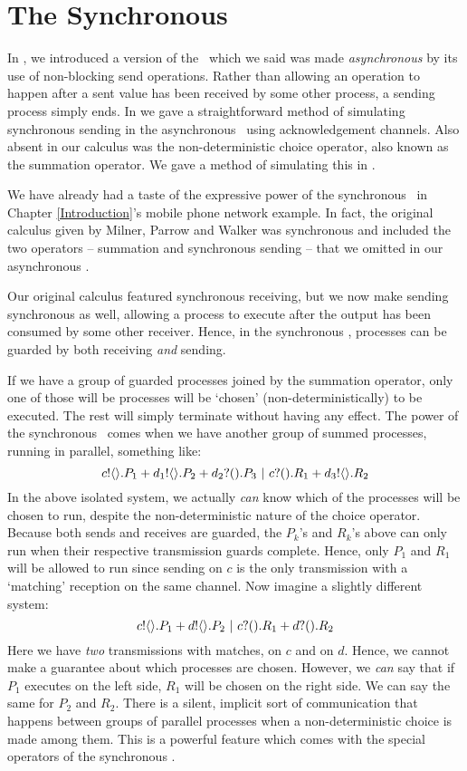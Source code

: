 \chapter{The Synchronous \Picalc}\label{sync_and_express}
In , we introduced a version of the \picalc\ which we said was made \emph{asynchronous} by its use of non-blocking send operations.  
Rather than allowing an operation to happen after a sent value has been received by some other process, a sending process simply ends.  
In  we gave a straightforward method of simulating synchronous sending in the asynchronous \picalc\ using acknowledgement channels.  
Also absent in our calculus was the non-deterministic choice operator, also known as the summation operator.  
We gave a method of simulating this in .

We have already had a taste of the expressive power of the synchronous \picalc\ in Chapter \ref{Introduction}'s mobile phone network example.  In fact, the original calculus given by Milner, Parrow and Walker was synchronous and included the two operators -- summation and synchronous sending -- that we omitted in our asynchronous \picalc.  

Our original calculus featured synchronous receiving, but we now make sending synchronous as well, allowing a process to execute after the output has been consumed by some other receiver.  
Hence, in the synchronous \picalc, processes can be guarded by both receiving \emph{and} sending.  


If we have a group of guarded processes joined by the summation operator, only one of those will be processes will be `chosen' (non-deterministically) to be executed.  
The rest will simply terminate without having any effect.  
The power of the synchronous \picalc\ comes when we have another group of summed processes, running in parallel, something like: 
\[
	{c}!\langle{}\rangle.P_1 + {d_1}!\langle{}\rangle.P_2 + {d_2}?({}).P_3 \ |\  {c}?({}).R_1 + {d_3}!\langle{}\rangle.R_2
\]
In the above isolated system, we actually \emph{can} know which of the processes will be chosen to run, despite the non-deterministic nature of the choice operator.  
Because both sends and receives are guarded, the $P_k$'s and $R_k$'s above can only run when their respective transmission guards complete.  
Hence, only $P_1$ and $R_1$ will be allowed to run since sending on $c$ is the only transmission with a `matching' reception on the same channel.  
Now imagine a slightly different system:
\[
	{c}!\langle{}\rangle.P_1 + {d}!\langle{}\rangle.P_2 \ |\  {c}?({}).R_1 + {d}?({}).R_2
\]
Here we have \emph{two} transmissions with matches, on $c$ and on $d$.  
Hence, we cannot make a guarantee about which processes are chosen.  
However, we \emph{can} say that if $P_1$ executes on the left side, $R_1$ will be chosen on the right side.  
We can say the same for $P_2$ and $R_2$.  
There is a silent, implicit sort of communication that happens between groups of parallel processes when a non-deterministic choice is made among them.  
This is a powerful feature which comes with the special operators of the synchronous \picalc.  

